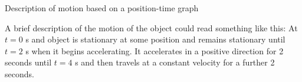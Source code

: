 \begin{wex}{Description of motion based on a position-time graph}
{\begin{center}
\end{center}

A brief description of the motion of the object could read something like this: At $t=0$ s and object is stationary at some position and remains stationary until $t=2$ s when it begins accelerating. It accelerates in a positive direction for 2 seconds until $t=4$ s and then travels at a constant velocity for a further 2 seconds.}
\end{wex}

